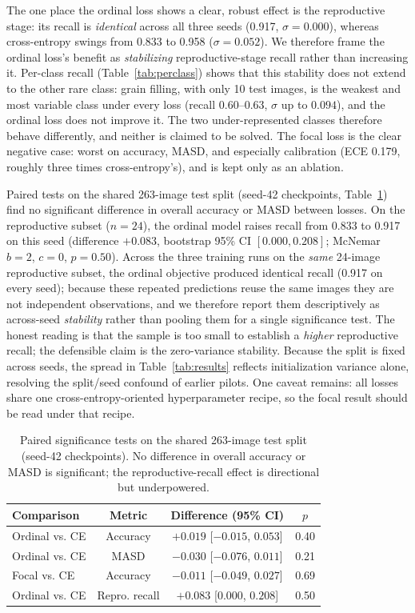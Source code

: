 \documentclass[conference]{IEEEtran}
\begin{document}
The one place the ordinal loss shows a clear, robust effect is the reproductive stage: its recall is \emph{identical} across all three seeds (0.917, $\sigma=0.000$), whereas cross-entropy swings from 0.833 to 0.958 ($\sigma=0.052$). We therefore frame the ordinal loss's benefit as \emph{stabilizing} reproductive-stage recall rather than increasing it. Per-class recall (Table~\ref{tab:perclass}) shows that this stability does not extend to the other rare class: grain filling, with only 10 test images, is the weakest and most variable class under every loss (recall $0.60$--$0.63$, $\sigma$ up to $0.094$), and the ordinal loss does not improve it. The two under-represented classes therefore behave differently, and neither is claimed to be solved. The focal loss is the clear negative case: worst on accuracy, MASD, and especially calibration (ECE 0.179, roughly three times cross-entropy's), and is kept only as an ablation.

Paired tests on the shared 263-image test split (seed-42 checkpoints, Table~\ref{tab:paired}) find no significant difference in overall accuracy or MASD between losses. On the reproductive subset ($n=24$), the ordinal model raises recall from 0.833 to 0.917 on this seed (difference $+0.083$, bootstrap 95\% CI $[0.000,0.208]$; McNemar $b{=}2$, $c{=}0$, $p{=}0.50$). Across the three training runs on the \emph{same} 24-image reproductive subset, the ordinal objective produced identical recall (0.917 on every seed); because these repeated predictions reuse the same images they are not independent observations, and we therefore report them descriptively as across-seed \emph{stability} rather than pooling them for a single significance test. The honest reading is that the sample is too small to establish a \emph{higher} reproductive recall; the defensible claim is the zero-variance stability. Because the split is fixed across seeds, the spread in Table~\ref{tab:results} reflects initialization variance alone, resolving the split/seed confound of earlier pilots. One caveat remains: all losses share one cross-entropy-oriented hyperparameter recipe, so the focal result should be read under that recipe.

\begin{table}[t]
\centering
\caption{Paired significance tests on the shared 263-image test split (seed-42 checkpoints). No difference in overall accuracy or MASD is significant; the reproductive-recall effect is directional but underpowered.}
\label{tab:paired}
\small
\begin{tabular}{lccc}
\toprule
\textbf{Comparison} & \textbf{Metric} & \textbf{Difference (95\% CI)} & \textbf{$p$} \\
\midrule
Ordinal vs. CE & Accuracy & $+0.019$ [$-0.015$, $0.053$] & 0.40 \\
Ordinal vs. CE & MASD & $-0.030$ [$-0.076$, $0.011$] & 0.21 \\
Focal vs. CE & Accuracy & $-0.011$ [$-0.049$, $0.027$] & 0.69 \\
Ordinal vs. CE & Repro. recall & $+0.083$ [$0.000$, $0.208$] & 0.50 \\
\bottomrule
\end{tabular}
\end{table}
\end{document}
